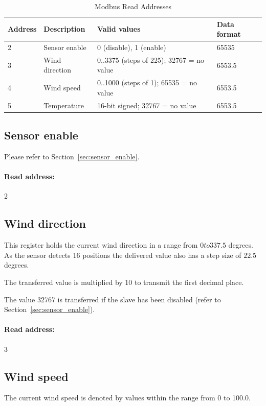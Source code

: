 \begin{table}[ht]

    \centering
    \begin{tabular}{|l|l|l|l|}
    \hline \textbf{Address} & \textbf{Description} & \textbf{Valid values} & \textbf{Data format} \\ 
    \hline
    \hline 2 & Sensor enable & 0 (disable), 1 (enable) & 65535 \\ 
    \hline 3 & Wind direction & 0..3375 (steps of 225); 32767 = no value & 6553.5 \\ 
    \hline 4 & Wind speed & 0..1000 (steps of 1); 65535 = no value & 6553.5 \\ 
    \hline 5 & Temperature & 16-bit signed; 32767 = no value & 6553.5 \\ 
    \hline 
    \end{tabular}
    \caption{Modbus Read Addresses}
    \label{tab:modbus_read}
\end{table}

\subsection{Sensor enable}
Please refer to Section~\ref{sec:sensor_enable}.

\paragraph{Read address:} 2

\subsection{Wind direction}
This register holds the current wind direction in a range from $0 to 337.5$ degrees. As the sensor detects 16 positions the delivered value also has a step size of $22.5$ degrees.

The transferred value is multiplied by 10 to transmit the first decimal place.

The value 32767 is transferred if the slave has been disabled (refer to Section~\ref{sec:sensor_enable}).

\paragraph{Read address:} 3

\subsection{Wind speed}
The current wind speed is denoted by values within the range from 0 to 100.0.

